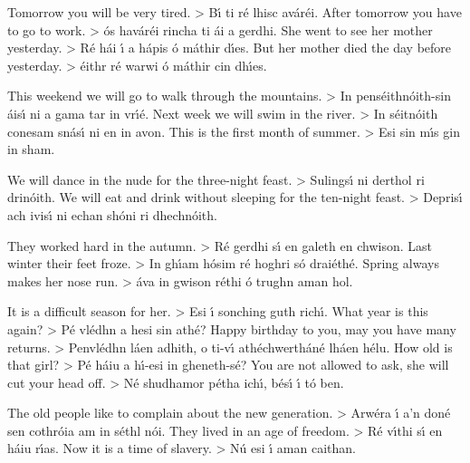 Tomorrow you will be very tired. > B\'{\i} ti r\'{e} lhisc av\'{a}r\'{e}i.
After tomorrow you have to go to work. > \'{o}s hav\'{a}r\'{e}i rincha ti \'{a}i a gerdhi.
She went to see her mother yesterday. > R\'{e} h\'{a}i \'{\i} a h\'{a}pis \'{o} m\'{a}thir d\'{\i}es.
But her mother died the day before yesterday. > \'{e}ithr r\'{e} warwi \'{o} m\'{a}thir cin dh\'{\i}es.

This weekend we will go to walk through the mountains. > In pens\'{e}ithn\'{o}ith-sin \'{a}is\'{\i} ni a gama 
                                                                                               tar in vr\'{\i}\'{e}.
Next week we will swim in the river. > In s\'{e}itn\'{o}ith conesam sn\'{a}s\'{\i} ni en in avon.
This is the first month of summer. > Esi sin m\'{\i}s gin in sham.

We will dance in the nude for the three-night feast. > Sulings\'{\i} ni derthol ri drin\'{o}ith.
We will eat and drink without sleeping for the ten-night feast. > Depris\'{\i} ach ivis\'{\i} ni echan 
                                                                                                       sh\'{o}ni ri dhechn\'{o}ith.

They worked hard in the autumn. > R\'{e} gerdhi s\'{\i} en galeth en chwison.
Last winter their feet froze. > In gh\'{\i}am h\'{o}sim r\'{e} hoghri s\'{o} drai\'{e}th\'{e}.
Spring always makes her nose run. > \'{a}va in gwison r\'{e}thi \'{o} trughn aman hol.

It is a difficult season for her. > Esi \'{\i} sonching guth rich\'{\i}.
What year is this again? > P\'{e} vl\'{e}dhn a hesi sin ath\'{e}?
Happy birthday to you, may you have many returns. > Penvl\'{e}dhn l\'{a}en adhith, o ti-v\'{\i}  
                                                                                        ath\'{e}chwerth\'{a}n\'{e} lh\'{a}en h\'{e}lu.
How old is that girl? > P\'{e} h\'{a}iu a h\'{\i}-esi in gheneth-s\'{e}?
You are not allowed to ask, she will cut your head off. > N\'{e} shudhamor p\'{e}tha ich\'{\i}, b\'{e}s\'{\i} \'{\i} t\'{o} 
                                                                                           ben.

The old people like to complain about the new generation. > Arw\'{e}ra \'{\i} a’n don\'{e} sen cothr\'{o}ia 
                                                                                                  am in s\'{e}thl n\'{o}i.
They lived in an age of freedom. > R\'{e} v\'{\i}thi s\'{\i} en h\'{a}iu r\'{\i}as.
Now it is a time of slavery. > N\'{u} esi \'{\i} aman caithan.
